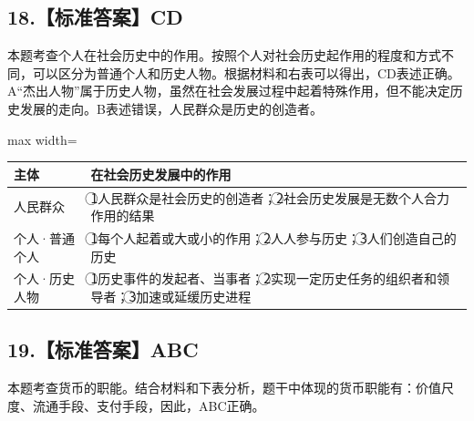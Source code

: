 \documentclass[UTF8,11pt]{ctexart}
\begin{document}
\subsection*{18.【标准答案】CD}

本题考查个人在社会历史中的作用。按照个人对社会历史起作用的程度和方式不同，可以区分为普通个人和历史人物。根据材料和右表可以得出，CD表述正确。A“杰出人物”属于历史人物，虽然在社会发展过程中起着特殊作用，但不能决定历史发展的走向。B表述错误，人民群众是历史的创造者。


\begin{center}\begin{adjustbox}{max width=\linewidth}\begin{tabular}{|>{\raggedright\arraybackslash}p{\dimexpr(\linewidth-4\tabcolsep-3\arrayrulewidth)/2\relax}|>{\raggedright\arraybackslash}p{\dimexpr(\linewidth-4\tabcolsep-3\arrayrulewidth)/2\relax}|}\hline
主体 & 在社会历史发展中的作用\\\hline
人民群众 & \textcircled{1}人民群众是社会历史的创造者；\textcircled{2}社会历史发展是无数个人合力作用的结果\\\hline
个人·普通个人 & \textcircled{1}每个人起着或大或小的作用；\textcircled{2}人人参与历史；\textcircled{3}人们创造自己的历史\\\hline
个人·历史人物 & \textcircled{1}历史事件的发起者、当事者；\textcircled{2}实现一定历史任务的组织者和领导者；\textcircled{3}加速或延缓历史进程\\\hline\end{tabular}\end{adjustbox}\end{center}

\subsection*{19.【标准答案】ABC}

本题考查货币的职能。结合材料和下表分析，题干中体现的货币职能有：价值尺度、流通手段、支付手段，因此，ABC正确。
\end{document}
